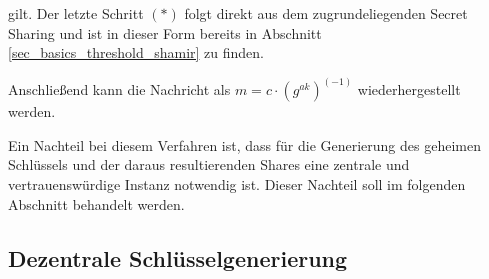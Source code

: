 gilt. Der letzte Schritt \((*)\) folgt direkt aus dem zugrundeliegenden Secret Sharing und ist in dieser Form bereits in Abschnitt \ref{sec_basics_threshold_shamir} zu finden.

Anschließend kann die Nachricht als \(m = c \cdot (g^{ak})^{(-1)}\) wiederhergestellt werden. 

Ein Nachteil bei diesem Verfahren ist, dass für die Generierung des geheimen Schlüssels und der daraus resultierenden Shares eine zentrale und vertrauenswürdige Instanz notwendig ist. Dieser Nachteil soll im folgenden Abschnitt behandelt werden.

\subsection{Dezentrale Schlüsselgenerierung}